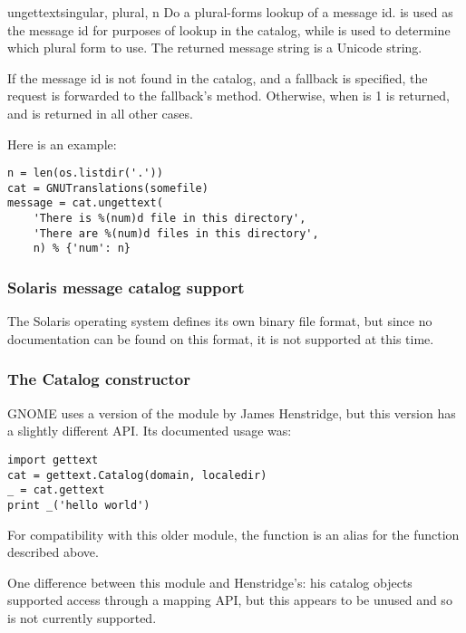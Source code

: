 \begin{methoddesc}[GNUTranslations]{ungettext}{singular, plural, n}
Do a plural-forms lookup of a message id.   is used as
the message id for purposes of lookup in the catalog, while  is
used to determine which plural form to use.  The returned message
string is a Unicode string.

If the message id is not found in the catalog, and a fallback is
specified, the request is forwarded to the fallback's
 method.  Otherwise, when  is 1  is
returned, and  is returned in all other cases.

Here is an example:

\begin{verbatim}
n = len(os.listdir('.'))
cat = GNUTranslations(somefile)
message = cat.ungettext(
    'There is %(num)d file in this directory',
    'There are %(num)d files in this directory',
    n) % {'num': n}
\end{verbatim}

\end{methoddesc}

\subsubsection{Solaris message catalog support}

The Solaris operating system defines its own binary
 file format, but since no documentation can be found on
this format, it is not supported at this time.

\subsubsection{The Catalog constructor}

GNOME uses a version of the  module by
James Henstridge, but this version has a slightly different API.  Its
documented usage was:

\begin{verbatim}
import gettext
cat = gettext.Catalog(domain, localedir)
_ = cat.gettext
print _('hello world')
\end{verbatim}

For compatibility with this older module, the function
 is an alias for the 
function described above.

One difference between this module and Henstridge's: his catalog
objects supported access through a mapping API, but this appears to be
unused and so is not currently supported.

